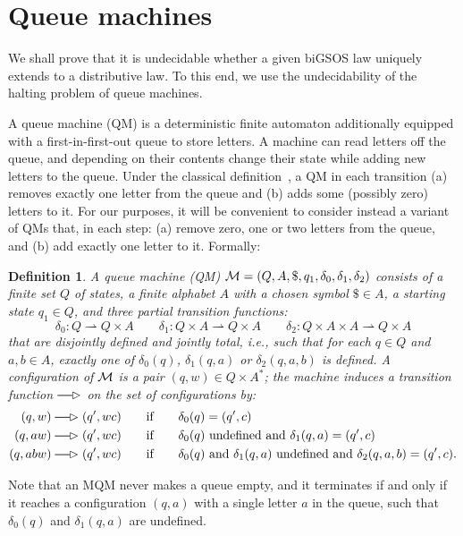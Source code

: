 \documentclass[adraft,copyright,creativecommons]{eptcs}
\newtheorem{definition}[theorem]{Definition}
\newcommand{\pto}{\rightharpoonup}
\newcommand{\abstractgoes}[2]{\setbox0=\hbox{\ ${\scriptstyle#2}$\ }
\ifdim\wd0<12pt\wd0=12pt\fi
\mathrel{\stackrel{#2}{\rule[2.2pt]{\wd0}{0.6pt}}\mkern-6mu{#1}}}
\newcommand{\mqmgoes}[1]{\abstractgoes{\rhd}{#1}}
\begin{document}
\section{Queue machines}\label{sec:queue}

We shall prove that it is undecidable whether a given biGSOS law uniquely extends to a distributive law. To this end, we use the undecidability of the halting problem of queue machines.

A queue machine (QM) is a deterministic finite automaton additionally equipped with a first-in-first-out queue to store letters. A machine can read letters off the queue, and depending on their contents change their state while adding new letters to the queue.
Under the classical definition~\cite{kozen}, a QM in each transition (a) removes exactly one letter from the queue and (b) adds some (possibly zero) letters to it. 
For our purposes, it will be convenient to consider instead a variant of QMs that, in each step:
(a) remove zero, one or two letters from the queue, and
(b) add exactly one letter to it. 
Formally:
\begin{definition}\label{MQM_def}\rm
A {\em queue machine} (QM) ${\cal M}=(Q,A, \$, q_1, \delta_0, \delta_1, \delta_2)$ consists of a finite set $Q$ of states, a finite alphabet $A$ with a chosen symbol $\$\in A$, a starting state $q_1\in Q$, and three partial transition functions:
\[
	\delta_0: Q \pto Q\times A \qquad \delta_1: Q \times A \pto Q\times A \qquad \delta_2: Q \times A \times A \pto Q\times A
\]
that are disjointly defined and jointly total, i.e., such that for each $q\in Q$ and $a,b\in A$, exactly one of $\delta_0(q)$, $\delta_1(q,a)$ or $\delta_2(q,a,b)$ is defined.
A {\em configuration} of ${\cal M}$ is a pair $(q,w)\in Q\times A^*$; the machine induces a transition function $\mqmgoes{}$ on the set of configurations by:
\begin{align*}
	(q,w)  \mqmgoes{} (q',wc) \qquad &\mbox{if} \qquad \delta_0(q)=(q',c) \\
	(q,aw)  \mqmgoes{} (q',wc) \qquad &\mbox{if} \qquad \delta_0(q) \mbox{ undefined and }\delta_1(q,a)=(q',c) \\
	(q,abw) \mqmgoes{} (q',wc) \qquad &\mbox{if} \qquad \delta_0(q) \mbox{ and } \delta_1(q,a) \mbox{ undefined and }\delta_2(q,a,b)=(q',c).
\end{align*}
\end{definition}
Note that an MQM never makes a queue empty, and it terminates if and only if it reaches a configuration $(q,a)$ with a single letter $a$ in the queue, such that $\delta_0(q)$ and $\delta_1(q,a)$ are undefined.
\end{document}
